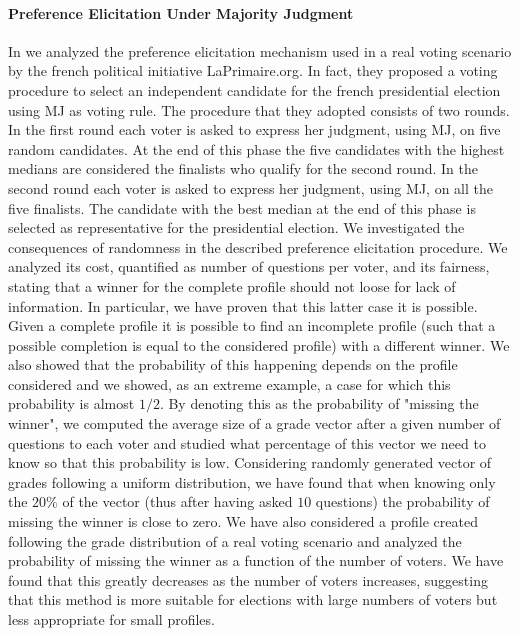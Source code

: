 \paragraph{Preference Elicitation Under Majority Judgment}
In  we analyzed the preference elicitation mechanism used in a real voting scenario by the french political initiative LaPrimaire.org.
In fact, they proposed a voting procedure to select an independent candidate for the french presidential election using \ac{MJ} as voting rule.
The procedure that they adopted consists of two rounds. In the first round each voter is asked to express her judgment, using \ac{MJ}, on five random candidates. At the end of this phase the five candidates with the highest medians are considered the finalists who qualify for the second round. In the second round each voter is asked to express her judgment, using \ac{MJ}, on all the five finalists. The candidate with the best median at the end of this phase is selected as representative for the presidential election.
We investigated the consequences of randomness in the described preference elicitation procedure. We analyzed its cost, quantified as number of questions per voter, and its fairness, stating that a winner for the complete profile should not loose for lack of information.
In particular, we have proven that this latter case it is possible. Given a complete profile it is possible to find an incomplete profile (such that a possible completion is equal to the considered profile) with a different winner.
We also showed that the probability of this happening depends on the profile considered and we showed, as an extreme example, a case for which this probability is almost $1/2$.
By denoting this as the probability of "missing the winner", we computed the average size of a grade vector after a given number of questions to each voter and studied what percentage of this vector we need to know so that this probability is low.
Considering randomly generated vector of grades following a uniform distribution, we have found that when knowing only the $20\%$ of the vector (thus after having asked $10$ questions) the probability of missing the winner is close to zero.
We have also considered a profile created following the grade distribution of a real voting scenario and analyzed the probability of missing the winner as a function of the number of voters. We have found that this greatly decreases as the number of voters increases, suggesting that this method is more suitable for elections with large numbers of voters but less appropriate for small profiles.

